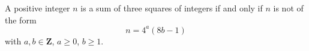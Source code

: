 A positive integer $n$ is a sum of three squares of integers if and only if $n$ is not of the form
$$
n = 4^a (8b - 1)
$$
with $a, b \in \mathbf{Z}$, $a \geq 0$, $b \geq 1$.
